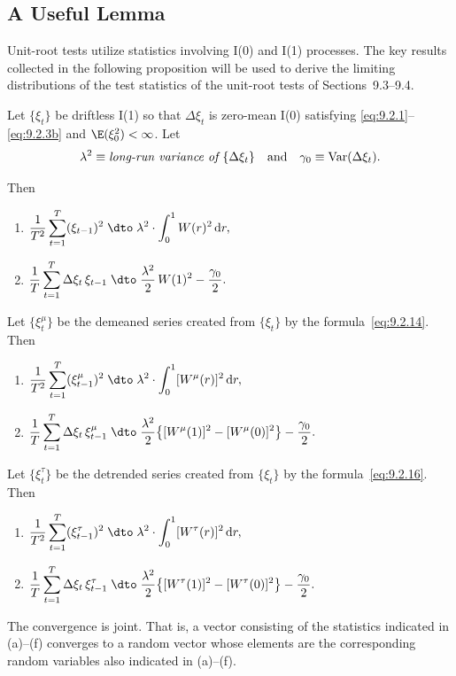 \subsection*{A Useful Lemma}

Unit-root tests utilize statistics involving I(0) and I(1) processes. The key results
collected in the following proposition will be used to derive the limiting distributions of the test statistics of the unit-root tests of Sections~9.3--9.4.

\begin{proposition}
\label{prop:9.2}
Let $\{\xi_t\}$ be driftless I(1) so that $\Delta \xi_t$ is zero-mean I(0) satisfying
\eqref{eq:9.2.1}--\eqref{eq:9.2.3b} and $\E(\xi_0^2) < \infty$. Let
\[
\lambda^2 \equiv \textit{long-run variance of } \{\Delta \xi_t\}
\quad \text{and} \quad
\gamma_0 \equiv \operatorname{Var}(\Delta \xi_t).
\]

\medskip\noindent
Then
\begin{enumerate}[label=(\alph*)]
\item $\displaystyle \frac{1}{T^2} \sum_{t=1}^{T} (\xi_{t-1})^2
\;\dto\; \lambda^2 \cdot \int_0^1 W(r)^2\,\mathrm{d}r,$

\item $\displaystyle \frac{1}{T} \sum_{t=1}^{T} \Delta\xi_t\, \xi_{t-1}
\;\dto\; \frac{\lambda^2}{2}\, W(1)^2 - \frac{\gamma_0}{2}.$
\end{enumerate}

\medskip\noindent
Let $\{\xi_t^\mu\}$ be the demeaned series created from $\{\xi_t\}$ by the formula~\eqref{eq:9.2.14}. Then
\begin{enumerate}[label=(\alph*),start=3]
\item $\displaystyle \frac{1}{T^2} \sum_{t=1}^{T} (\xi_{t-1}^\mu)^2
\;\dto\; \lambda^2 \cdot \int_0^1 [W^\mu(r)]^2\,\mathrm{d}r,$

\item $\displaystyle \frac{1}{T} \sum_{t=1}^{T} \Delta\xi_t\, \xi_{t-1}^\mu
\;\dto\; \frac{\lambda^2}{2}\big\{[W^\mu(1)]^2 - [W^\mu(0)]^2\big\} - \frac{\gamma_0}{2}.$
\end{enumerate}

\medskip\noindent
Let $\{\xi_t^\tau\}$ be the detrended series created from $\{\xi_t\}$ by the formula~\eqref{eq:9.2.16}. Then
\begin{enumerate}[label=(\alph*),start=5]
\item $\displaystyle \frac{1}{T^2} \sum_{t=1}^{T} (\xi_{t-1}^\tau)^2
\;\dto\; \lambda^2 \cdot \int_0^1 [W^\tau(r)]^2\,\mathrm{d}r,$

\item $\displaystyle \frac{1}{T} \sum_{t=1}^{T} \Delta\xi_t\, \xi_{t-1}^\tau
\;\dto\; \frac{\lambda^2}{2}\big\{[W^\tau(1)]^2 - [W^\tau(0)]^2\big\} - \frac{\gamma_0}{2}.$
\end{enumerate}

\medskip\noindent
The convergence is joint. That is, a vector consisting of the statistics indicated in
(a)--(f) converges to a random vector whose elements are the corresponding random
variables also indicated in (a)--(f).
\end{proposition}

